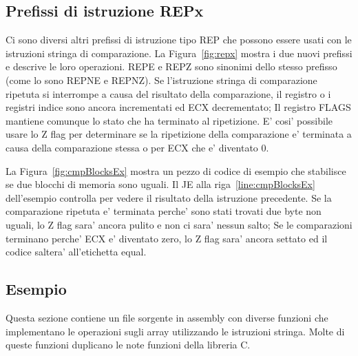 \subsection{Prefissi di istruzione {\code REPx}}

Ci sono diversi altri prefissi di istruzione tipo {\code REP} che possono
essere usati con le istruzioni stringa di comparazione. La Figura~\ref{fig:repx}
mostra i due nuovi prefissi e descrive le loro operazioni. {\code REPE}  e
{\code REPZ} sono sinonimi dello stesso prefisso (come lo sono {\code REPNE} 
e {\code REPNZ}). Se l'istruzione stringa di comparazione ripetuta si
interrompe a causa del risultato della comparazione, il registro o i registri
indice sono ancora incrementati ed ECX decrementato; Il registro FLAGS
mantiene comunque lo stato che ha terminato al ripetizione.
E' cosi' possibile usare lo Z flag per determinare se la
ripetizione della comparazione e' terminata a causa della comparazione
stessa o per ECX che e' diventato 0. 

La Figura~\ref{fig:cmpBlocksEx} mostra un pezzo di codice di esempio che
stabilisce se due blocchi di memoria sono uguali. Il {\code JE} alla riga~\ref{line:cmpBlocksEx} dell'esempio controlla per vedere il 
risultato della istruzione precedente. Se la comparazione ripetuta e'
terminata perche' sono stati trovati due byte non uguali, lo Z flag sara'
ancora pulito e non ci sara' nessun salto; Se le comparazioni terminano
perche' ECX e' diventato zero, lo Z flag sara' ancora settato ed il codice
saltera' all'etichetta {\code equal}. 

\subsection{Esempio}

Questa sezione contiene un file sorgente in assembly con diverse funzioni
che implementano le operazioni sugli array utilizzando le istruzioni stringa.
Molte di queste funzioni duplicano le note funzioni della libreria C.

